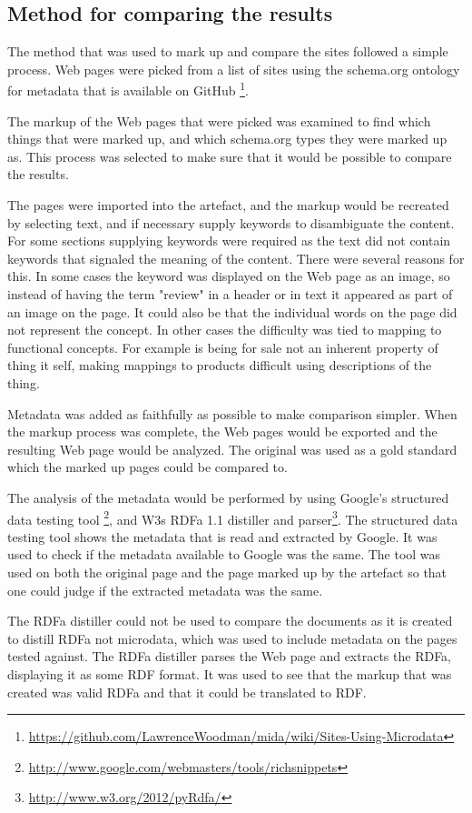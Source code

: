 \subsection{Method for comparing the results}
The method that was used to mark up and compare the sites followed a simple process.
Web pages were picked from a list of sites using the schema.org ontology for metadata that is available on GitHub
\footnote{\url{https://github.com/LawrenceWoodman/mida/wiki/Sites-Using-Microdata}}.

The markup of the Web pages that were picked was examined to find which things that were marked up,
and which schema.org types they were marked up as.
This process was selected to make sure that it would be possible to compare the results.

The pages were imported into the artefact, and the markup would be recreated by selecting text,
and if necessary supply keywords to disambiguate the content.
For some sections supplying keywords were required as the text did not contain keywords that signaled the meaning of the content.
There were several reasons for this.
In some cases the keyword was displayed on the Web page as an image,
so instead of having the term "review" in a header or in text it appeared as part of an image on the page.
It could also be that the individual words on the page did not represent the concept.
In other cases the difficulty was tied to mapping to functional concepts.
For example is being for sale not an inherent property of thing it self,
making mappings to products difficult using descriptions of the thing.

Metadata was added as faithfully as possible to make comparison simpler.
When the markup process was complete, the Web pages would be exported and the resulting Web page would be analyzed.
The original was used as a gold standard which the marked up pages could be compared to.

The analysis of the metadata would be performed by using Google's structured data testing tool
\footnote{\url{http://www.google.com/webmasters/tools/richsnippets}},
and W3s RDFa 1.1 distiller and parser\footnote{\url{http://www.w3.org/2012/pyRdfa/}}.
The structured data testing tool shows the metadata that is read and extracted by Google.
It was used to check if the metadata available to Google was the same.
The tool was used on both the original page and the page marked up by the artefact so that one could judge if the
extracted metadata was the same.

The RDFa distiller could not be used to compare the documents as it is created to distill RDFa not microdata,
which was used to include metadata on the pages tested against.
The RDFa distiller parses the Web page and extracts the RDFa, displaying it as some RDF format.
It was used to see that the markup that was created was valid RDFa and that it could be translated to RDF.

